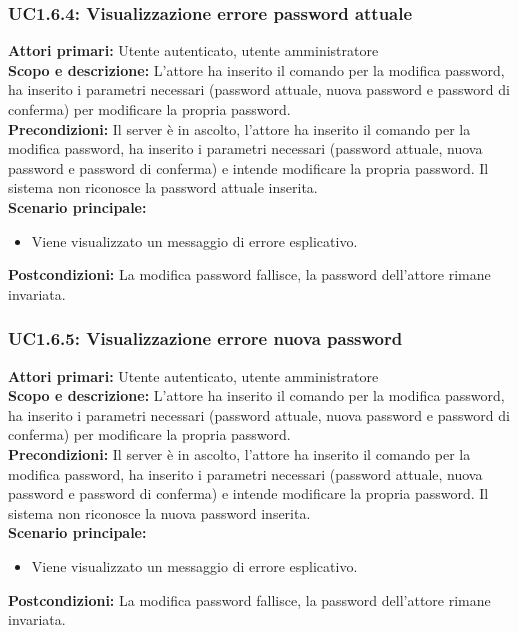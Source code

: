 \documentclass{scalatekids-article}
\begin{document}
\subsubsection{UC1.6.4: Visualizzazione errore password attuale}

\textbf{Attori primari:} Utente autenticato, utente amministratore\\
\textbf{Scopo e descrizione:}
L'attore ha inserito il comando per la modifica password, ha inserito i parametri necessari (password attuale, nuova password e password di conferma) per modificare la propria password.\\
\textbf{Precondizioni:} Il server è in ascolto, l'attore ha inserito il comando per la modifica password, ha inserito i parametri necessari (password attuale, nuova password e password di conferma) e intende modificare la propria password. Il sistema non riconosce la password attuale inserita.\\
\textbf{Scenario principale:}
\begin{itemize}
\item Viene visualizzato un messaggio di errore esplicativo.
\end{itemize}
\textbf{Postcondizioni:} La modifica password fallisce, la password dell'attore rimane invariata.

\subsubsection{UC1.6.5: Visualizzazione errore nuova password}

\textbf{Attori primari:} Utente autenticato, utente amministratore\\
\textbf{Scopo e descrizione:}
L'attore ha inserito il comando per la modifica password, ha inserito i parametri necessari (password attuale, nuova password e password di conferma) per modificare la propria password.\\
\textbf{Precondizioni:} Il server è in ascolto, l'attore ha inserito il comando per la modifica password, ha inserito i parametri necessari (password attuale, nuova password e password di conferma) e intende modificare la propria password. Il sistema non riconosce la nuova password inserita.\\
\textbf{Scenario principale:}
\begin{itemize}
\item Viene visualizzato un messaggio di errore esplicativo.
\end{itemize}
\textbf{Postcondizioni:} La modifica password fallisce, la password dell'attore rimane invariata.
\end{document}
